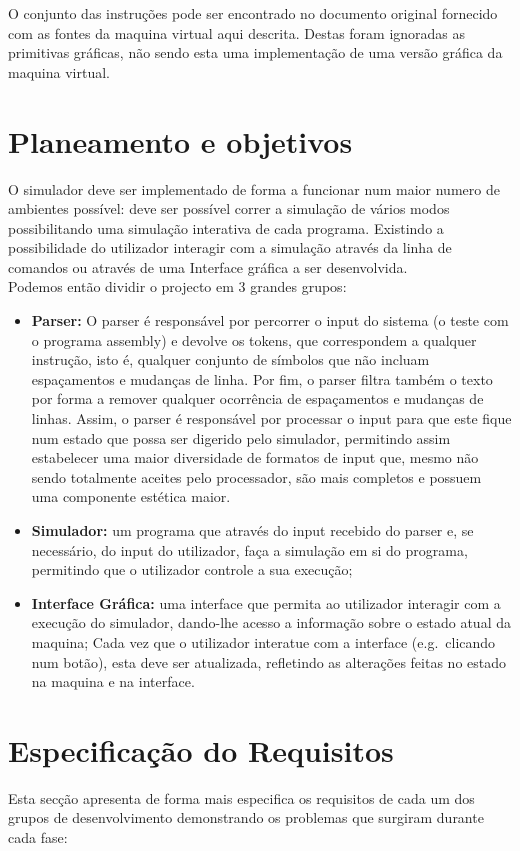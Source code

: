 \documentclass{report}
\begin{document}
\quad O conjunto das instruções pode ser encontrado no documento original fornecido com as fontes da maquina virtual aqui descrita.
Destas foram ignoradas as primitivas gráficas, não sendo esta uma implementação de uma versão gráfica da maquina virtual.

\section{Planeamento e objetivos}
\quad O simulador deve ser implementado de forma a funcionar num maior numero de ambientes possível:
deve ser possível correr a simulação de vários modos possibilitando uma simulação interativa de cada programa.
Existindo a possibilidade do utilizador interagir com a simulação através da linha de comandos ou através de uma Interface
gráfica a ser desenvolvida.\\
\null\quad Podemos então dividir o projecto em 3 grandes grupos:
\begin{itemize}
    \item \textbf{Parser:} O parser é responsável por percorrer o input do sistema (o teste com o programa assembly) e devolve
	os tokens, que correspondem a qualquer instrução, isto é, qualquer conjunto de símbolos que não incluam
	espaçamentos e mudanças de linha.
	\quad Por fim, o parser filtra também o texto por forma a remover qualquer ocorrência de espaçamentos e mudanças de linhas.
	Assim, o parser é responsável por processar o input para que este fique num estado que possa ser digerido pelo simulador,
	permitindo assim estabelecer uma maior diversidade de formatos de input que, mesmo não sendo totalmente aceites
	pelo processador, são mais completos e possuem uma componente estética maior.


	\item \textbf{Simulador:} um programa que através do input recebido do parser e, se necessário, do input do utilizador,
	faça a simulação em si do programa, permitindo que o utilizador controle a sua execução;

	\item \textbf{Interface Gráfica:} uma interface que permita ao utilizador interagir com a execução do simulador,
  dando-lhe acesso a informação sobre o estado atual da maquina;
	Cada vez que o utilizador interatue com a interface (e.g.\ clicando num botão), esta deve ser atualizada,
	refletindo as alterações feitas no estado na maquina e na interface.
\end{itemize}

\section{Especificação do Requisitos}
\quad Esta secção apresenta de forma mais especifica os requisitos de cada um dos grupos de desenvolvimento demonstrando os problemas que
surgiram durante cada fase:
\end{document}
